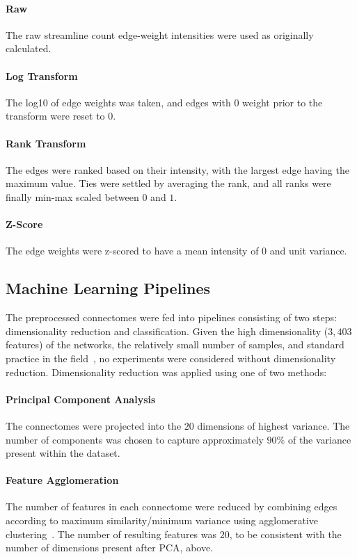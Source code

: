 \documentclass[10pt]{SelfArx} %
\newcommand{\new}[1]{\color{blue}#1\color{black}}
\begin{document}
\paragraph{Raw} The raw streamline count edge-weight intensities were used as originally calculated.

\paragraph{Log Transform} The log10 of edge weights was taken, and edges with $0$ weight prior to the transform were
reset to $0$.

\paragraph{Rank Transform} The edges were ranked based on their intensity, with the largest edge having the maximum
value. Ties were settled by averaging the rank, and all ranks were finally min-max scaled between $0$ and $1$.

\paragraph{Z-Score} The edge weights were z-scored to have a mean intensity of $0$ and unit variance.

\subsection*{Machine Learning Pipelines}

The preprocessed connectomes were fed into pipelines consisting of two steps: dimensionality reduction and
classification. \new{Given the high dimensionality ($3,403$ features) of the networks, the relatively small number of
samples, and standard practice in the field~\cite{Payabvash2019-tm,Park2015-uj,weis2020sex}, no experiments were
considered without dimensionality reduction.} Dimensionality reduction was applied using one of two methods:

\paragraph{Principal Component Analysis} The connectomes were projected into the $20$ dimensions of highest variance.
The number of components was chosen to capture approximately $90\%$ of the variance present within the dataset.

\paragraph{Feature Agglomeration} The number of features in each connectome were reduced by combining edges according
to maximum similarity/minimum variance using agglomerative clustering~\cite{Ward1963-uh}. The number of resulting
features was $20$, to be consistent with the number of dimensions present after PCA, above.
\end{document}
